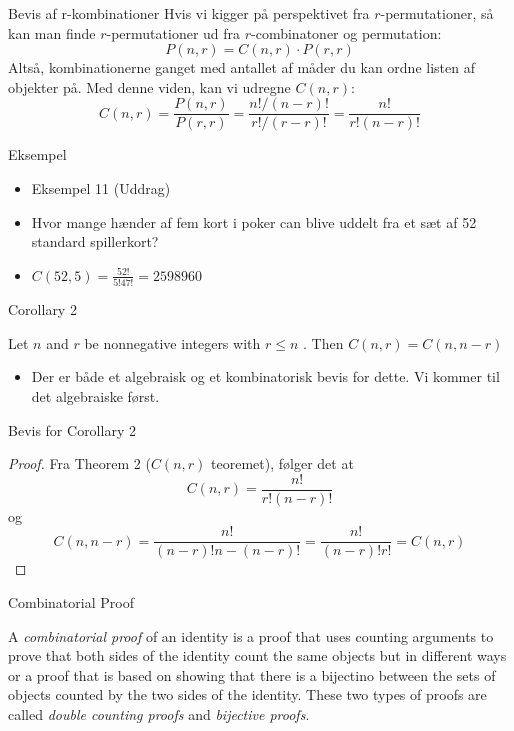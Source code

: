\documentclass{beamer}
\begin{document}
\begin{frame}{Bevis af r-kombinationer}
   Hvis vi kigger på perspektivet fra $r$-permutationer, så kan man finde $r$-permutationer ud fra $r$-combinatoner og permutation: 
   $$P(n,r) = C(n,r) \cdot P(r,r)$$
   Altså, kombinationerne ganget med antallet af måder du kan ordne listen af objekter på.
   Med denne viden, kan vi udregne $C(n,r)$:
   $$C(n,r) = \frac{P(n,r)}{P(r,r)} = \frac{n!/(n-r)!}{r!/(r-r)!} = \frac{n!}{r!(n-r)!}$$
\end{frame}

\begin{frame}{Eksempel}
\begin{itemize}
    \item<1-> Eksempel 11 (Uddrag)
    \item<1-> Hvor mange hænder af fem kort i poker can blive uddelt fra et sæt af 52 standard spillerkort? 
    \item<2-> $C(52,5) = \frac{52!}{5!47!} = 2598960$
\end{itemize}
\end{frame}

\begin{frame}{Corollary 2}
   \begin{corollary}
       Let $n$ and $r$ be nonnegative integers with $r \leq n$ . Then $C(n,r) = C(n,n-r)$
   \end{corollary} 
   \begin{itemize}
       \item Der er både et algebraisk og et kombinatorisk bevis for dette. Vi kommer til det algebraiske først.
   \end{itemize}
\end{frame}

\begin{frame}{Bevis for Corollary 2}
   \begin{proof}
       Fra Theorem 2 ($C(n,r)$  teoremet), følger det at
       $$C(n,r) = \frac{n!}{r!(n-r)!}$$
       og
       $$C(n,n-r) = \frac{n!}{(n-r)! n-(n-r)!} = \frac{n!}{(n-r)!r!} = C(n,r)$$
   \end{proof} 
\end{frame}

\begin{frame}{Combinatorial Proof}
   \begin{definition}
       A \textit{combinatorial proof} of an identity is a proof that uses counting arguments to prove that both sides of the identity count the same objects but in different ways or a proof that is based on showing that there is a bijectino between the sets of objects counted by the two sides of the identity. These two types of proofs are called \textit{double counting proofs} and \textit{bijective proofs}.
   \end{definition} 
\end{frame}
\end{document}
